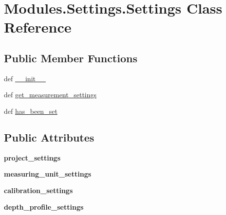 \hypertarget{classModules_1_1Settings_1_1Settings}{\section{Modules.\-Settings.\-Settings Class Reference}
\label{classModules_1_1Settings_1_1Settings}
}
\subsection*{Public Member Functions}
\begin{DoxyCompactItemize}
\item 
def \hyperlink{classModules_1_1Settings_1_1Settings_a25dbd5d28c5f34a37d3d94623fbff965}{\-\_\-\-\_\-init\-\_\-\-\_\-}
\item 
def \hyperlink{classModules_1_1Settings_1_1Settings_afc8e428ebdee3e90b722a4075523e2b3}{get\-\_\-measurement\-\_\-settings}
\item 
def \hyperlink{classModules_1_1Settings_1_1Settings_a868fb6778ea7863f2225265e46628776}{has\-\_\-been\-\_\-set}
\end{DoxyCompactItemize}
\subsection*{Public Attributes}
\begin{DoxyCompactItemize}
\item 
\hypertarget{classModules_1_1Settings_1_1Settings_a3a916d5221912c511460b7346afab6a6}{{\bfseries project\-\_\-settings}}\label{classModules_1_1Settings_1_1Settings_a3a916d5221912c511460b7346afab6a6}

\item 
\hypertarget{classModules_1_1Settings_1_1Settings_a38c96b3662b554c49d50d60c4aea68a6}{{\bfseries measuring\-\_\-unit\-\_\-settings}}\label{classModules_1_1Settings_1_1Settings_a38c96b3662b554c49d50d60c4aea68a6}

\item 
\hypertarget{classModules_1_1Settings_1_1Settings_af22dcf8cb45c44f27189dbc65357cb28}{{\bfseries calibration\-\_\-settings}}\label{classModules_1_1Settings_1_1Settings_af22dcf8cb45c44f27189dbc65357cb28}

\item 
\hypertarget{classModules_1_1Settings_1_1Settings_ac9e5732b22ef0dfc9f443e715d0a4f86}{{\bfseries depth\-\_\-profile\-\_\-settings}}\label{classModules_1_1Settings_1_1Settings_ac9e5732b22ef0dfc9f443e715d0a4f86}

\end{DoxyCompactItemize}


